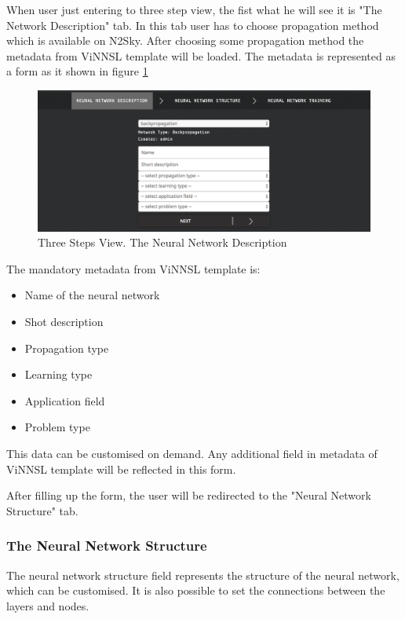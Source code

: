 When user just entering to three step view, the fist what he will see it is "The Network Description" tab. In this tab user has to choose propagation method which is available on N2Sky. After choosing some propagation method the metadata from ViNNSL template will be loaded. The metadata is represented as a form as it shown in figure \ref{fig:nn_desc_3_steps}

\begin{figure}[htbp]
\begin{center}
  \includegraphics[width=\linewidth]{components/5/img/nn_desc_3_steps.png}
  \caption{Three Steps View. The Neural Network Description}
  \label{fig:nn_desc_3_steps}
\end{center}
\end{figure}

The mandatory metadata from ViNNSL template is:
\begin{itemize}
\item Name of the neural network
\item Shot description
\item Propagation type
\item Learning type
\item Application field
\item Problem type
\end{itemize}

This data can be customised on demand. Any additional field in metadata of ViNNSL template will be reflected in this form.


After filling up the form, the user will be redirected to the "Neural Network Structure" tab.

\subsubsection{The Neural Network Structure}

The neural network structure field represents the structure of the neural network, which can be customised. It is also possible to set the connections between the layers and nodes. 

